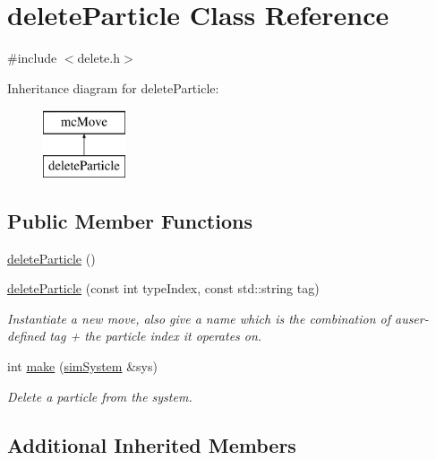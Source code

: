 \hypertarget{classdelete_particle}{\section{delete\-Particle Class Reference}
\label{classdelete_particle}
}


{\ttfamily \#include $<$delete.\-h$>$}

Inheritance diagram for delete\-Particle\-:\begin{figure}[H]
\begin{center}
\leavevmode
\includegraphics[height=2.000000cm]{classdelete_particle}
\end{center}
\end{figure}
\subsection*{Public Member Functions}
\begin{DoxyCompactItemize}
\item 
\hyperlink{classdelete_particle_a3b97ed18c7080043db26d2716c67dde0}{delete\-Particle} ()
\item 
\hyperlink{classdelete_particle_ae1a05ba703e5df3173384831fccc8698}{delete\-Particle} (const int type\-Index, const std\-::string tag)
\begin{DoxyCompactList}\small\item\em Instantiate a new move, also give a name which is the combination of auser-\/defined tag + the particle index it operates on. \end{DoxyCompactList}\item 
int \hyperlink{classdelete_particle_a14f86dd27a82f571caa12af04e22eb1f}{make} (\hyperlink{classsim_system}{sim\-System} \&sys)
\begin{DoxyCompactList}\small\item\em Delete a particle from the system. \end{DoxyCompactList}\end{DoxyCompactItemize}
\subsection*{Additional Inherited Members}


